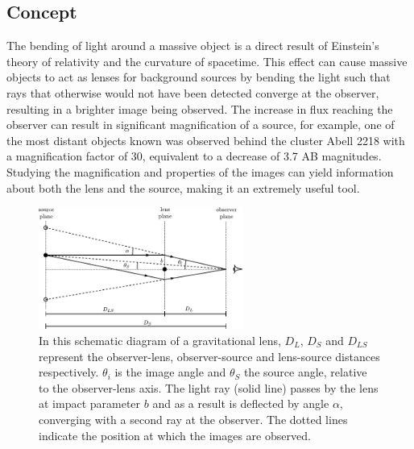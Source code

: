 	\subsection{Concept} %
	\label{sub:concept}
		The bending of light around a massive object is a direct result of Einstein's theory of relativity and the curvature of spacetime. This effect can cause massive objects to act as lenses for background sources by bending the light such that rays that otherwise would not have been detected converge at the observer, resulting in a brighter image being observed. The increase in flux reaching the observer can result in significant magnification of a source, for example, one of the most distant objects known was observed behind the cluster Abell 2218 with a magnification factor of 30, equivalent to a decrease of 3.7 AB magnitudes\cite{Distant_object_Abell2218}. Studying the magnification and properties of the images can yield information about both the lens and the source, making it an extremely useful tool\cite{Hartle}.
		\begin{figure}[!htbp]
			\centering
				\includegraphics[width=0.6\textwidth]{../Images/Lensing_light_bending.pdf}
			\caption[Diagram of a gravitational lens]{In this schematic diagram of a gravitational lens, $D_L$, $D_S$ and $D_{LS}$ represent the observer-lens, observer-source and lens-source distances respectively. $\theta_i$ is the image angle and $\theta_S$ the source angle, relative to the observer-lens axis. The light ray (solid line) passes by the lens at impact parameter $b$ and as a result is deflected by angle $\alpha$, converging with a second ray at the observer. The dotted lines indicate the position at which the images are observed\cite{Lensing_light_bending_diagram}.\label{fig:Lensing_light_bending}}
		\end{figure}

